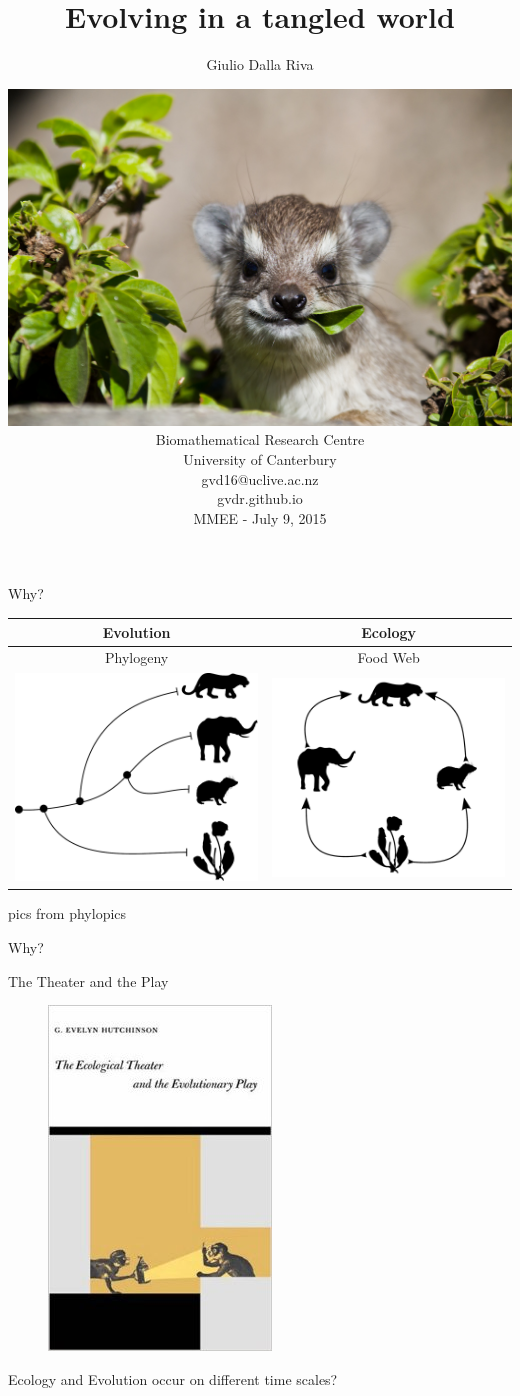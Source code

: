 \documentclass[]{beamer}
\title{Evolving in a tangled world}
\author{Giulio Dalla Riva}
\date{ \includegraphics[width=0.4\linewidth]{images/hyraxchew.jpg}\\
  {\tiny Biomathematical Research Centre\\
  University of Canterbury\\
  gvd16@uclive.ac.nz\\
  gvdr.github.io\\}
MMEE - July 9, 2015}
\begin{document}
\frame{\titlepage
\addtocounter{framenumber}{-1}}

\begin{frame}{Why?}

\centering
\begin{tabular}{|c|c|}\hline
Evolution & Ecology \\\hline\hline
Phylogeny & Food Web \\
\includegraphics[width=0.4 \textwidth]{images/small_phylo.pdf} & \includegraphics[width=0.4 \textwidth]{images/small_fw.pdf} \\ \hline
\end{tabular}
\tiny{pics from phylopics}
\end{frame}

\begin{frame}{Why?}

\centering
The Theater and the Play

\begin{figure}
\centering
\includegraphics[height=0.5 \textheight]{images/hutchinson_ecotheatreevoplay.jpg}
\end{figure}
\centering
{\tiny Ecology and Evolution occur on different time scales?}

\end{frame}
\end{document}

